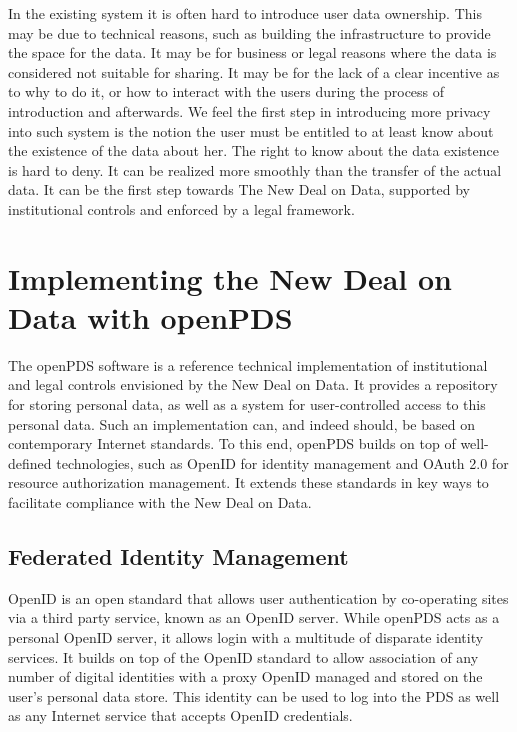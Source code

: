 In the existing system it is often hard to introduce user data ownership.
This may be due to technical reasons, such as building the infrastructure to provide the space for the data.
It may be for business or legal reasons where the data is considered not suitable for sharing.
It may be for the lack of a clear incentive as to why to do it, or how to interact with the users during the process of introduction and afterwards.
We feel the first step in introducing more privacy into such system is the notion the user must be entitled to at least know about the existence of the data about her.
The right to know about the data existence is hard to deny.
It can be realized more smoothly than the transfer of the actual data.
It can be the first step towards The New Deal on Data, supported by institutional controls and enforced by a legal framework.

\section{Implementing the New Deal on Data with openPDS}

The openPDS software is a reference technical implementation of institutional and legal controls envisioned by the New Deal on Data.
It provides a repository for storing personal data, as well as a system for user-controlled access to this personal data.
Such an implementation can, and indeed should, be based on contemporary Internet standards.
To this end, openPDS builds on top of well-defined technologies, such as OpenID for identity management and OAuth 2.0 for resource authorization management.
It extends these standards in key ways to facilitate compliance with the New Deal on Data.

\subsection{Federated Identity Management}

OpenID is an open standard that allows user authentication by co-operating sites via a third party service, known as an OpenID server.
While openPDS acts as a personal OpenID server, it allows login with a multitude of disparate identity services.
It builds on top of the OpenID standard to allow association of any number of digital identities with a proxy OpenID managed and stored on the user's personal data store.
This identity can be used to log into the PDS as well as any Internet service that accepts OpenID credentials.

